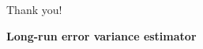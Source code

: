 \documentclass[10pt]{beamer}
\begin{document}
\begin{frame}[standout]
  Thank you!
\end{frame}




\appendix

%
%
%
%

\begin{frame}
\thispagestyle{empty}
\begin{center}
\Large{\textbf{Long-run error variance estimator}}
\end{center}
\end{frame}
\end{document}
